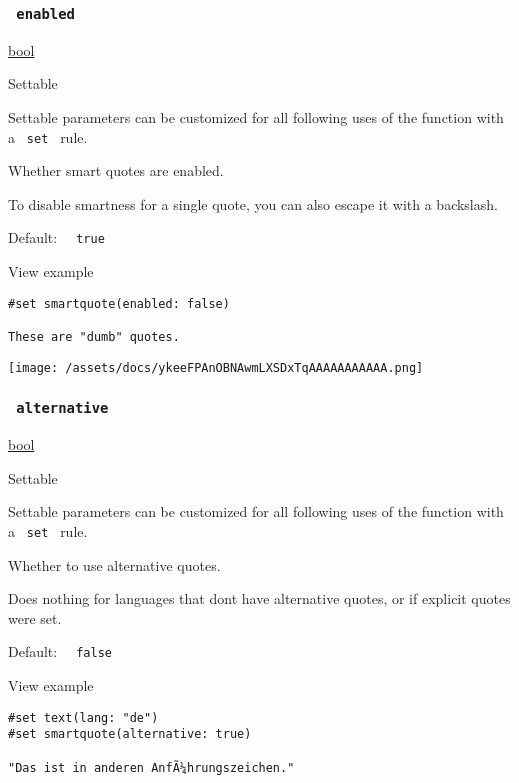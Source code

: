 \subsubsection{\texorpdfstring{\texttt{\ enabled\ }}{ enabled }}\label{parameters-enabled}

\href{/docs/reference/foundations/bool/}{bool}

{{ Settable }}

\label{parameters-enabled-settable-tooltip}
Settable parameters can be customized for all following uses of the
function with a \texttt{\ set\ } rule.

Whether smart quotes are enabled.

To disable smartness for a single quote, you can also escape it with a
backslash.

Default: \texttt{\ }{\texttt{\ true\ }}\texttt{\ }


View example

\begin{verbatim}
#set smartquote(enabled: false)

These are "dumb" quotes.
\end{verbatim}

\texttt{[image: /assets/docs/ykeeFPAnOBNAwmLXSDxTqAAAAAAAAAAA.png]}

\subsubsection{\texorpdfstring{\texttt{\ alternative\ }}{ alternative }}\label{parameters-alternative}

\href{/docs/reference/foundations/bool/}{bool}

{{ Settable }}

\label{parameters-alternative-settable-tooltip}
Settable parameters can be customized for all following uses of the
function with a \texttt{\ set\ } rule.

Whether to use alternative quotes.

Does nothing for languages that don\textquotesingle t have alternative
quotes, or if explicit quotes were set.

Default: \texttt{\ }{\texttt{\ false\ }}\texttt{\ }


View example

\begin{verbatim}
#set text(lang: "de")
#set smartquote(alternative: true)

"Das ist in anderen AnfÃ¼hrungszeichen."
\end{verbatim}

